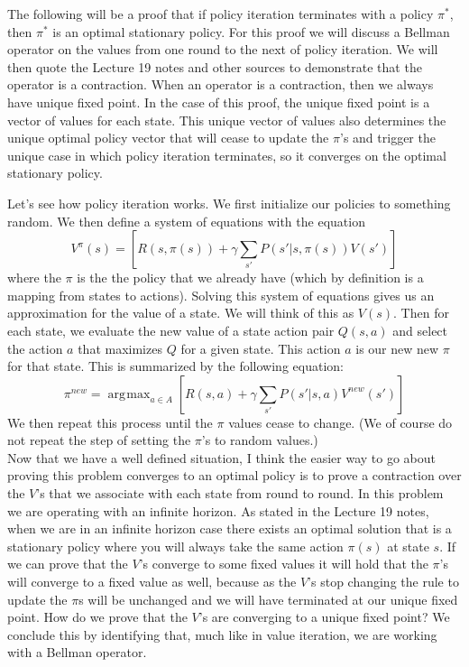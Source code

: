 \documentclass[solution, letterpaper]{cs121}
\DeclareMathOperator*{\argmax}{\arg\!\max}
\begin{document}

\subproblem{} %
The following will be a proof that if policy iteration terminates with a policy $\pi^*$, then $\pi^*$ is an optimal stationary policy. For this proof we will discuss a Bellman operator on the values from one round to the next of policy iteration. We will then quote the Lecture 19 notes and other sources to demonstrate that the operator is a contraction. When an operator is a contraction, then we always have unique fixed point. In the case of this proof, the unique fixed point is a vector of values for each state. This unique vector of values also determines the unique optimal policy vector that will cease to update the $\pi$'s and trigger the unique case in which policy iteration terminates, so it converges on the optimal stationary policy.  

Let's see how policy iteration works. We first initialize our policies to something random. We then define a system of equations with the equation
\[ V^{\pi}(s)  =  \left[ R(s,\pi(s) ) + \gamma \sum_{s'} P(s' | s,\pi(s))V(s')\right ]\]
where the $\pi$ is the the policy that we already have (which by definition is a mapping from states to actions). Solving this system of equations gives us an approximation for the value of a state. We will think of this as $V(s)$.
Then for each state, we evaluate the new value of a state action pair $Q(s,a)$ and select the action $a$ that maximizes $Q$ for a given state. This action $a$ is our new new $\pi$ for that state. This is summarized by the following equation:
\[\pi^{new} = \argmax_{a \in A}  \left[ R(s,a ) + \gamma \sum_{s'} P(s' | s,a)V^{new}(s')\right ]\]
We then repeat this process until the $\pi$ values cease to change. (We of course do not repeat the step of setting the $\pi$'s to random values.) \\

Now that we have a well defined situation, I think the easier way to go about proving this problem converges to an optimal policy is to prove a contraction over the $V$'s that we associate with each state from round to round.  In this problem we are operating with an infinite horizon. As stated in the Lecture 19 notes, when we are in an infinite horizon case there exists an optimal solution that is a stationary policy where you will always take the same action $\pi(s)$ at state $s$.  If we can prove that the $V$'s converge to some fixed values it will hold that the $\pi$'s will converge to a fixed value as well, because as the $V$'s stop changing the rule to update the $\pi$s will be unchanged and we will have terminated at our unique fixed point. How do we prove that the $V$'s are converging to a unique fixed point? We conclude this by identifying that, much like in value iteration, we are working with a Bellman operator.\\
\end{document}
